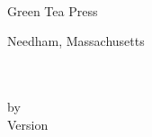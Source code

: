 
%
%
%
%
%
%





\pagebreak
\thispagestyle{empty}

\begin{flushright}
\vspace*{2.0in}

\begin{spacing}{3}
{\huge \thetitle} \\
{\large \thesubtitle} \\
\end{spacing}

\vspace{1.5in}

{\Large
\theauthors \\
}

\vspace{0.5in}

{\Large Green Tea Press}

{\small Needham, Massachusetts}

\vfill

\end{flushright}



\pagebreak
\thispagestyle{empty}

\textbf{\thetitle} \\
\thesubtitle \\
by \theauthors \\

Version \theversion \\

